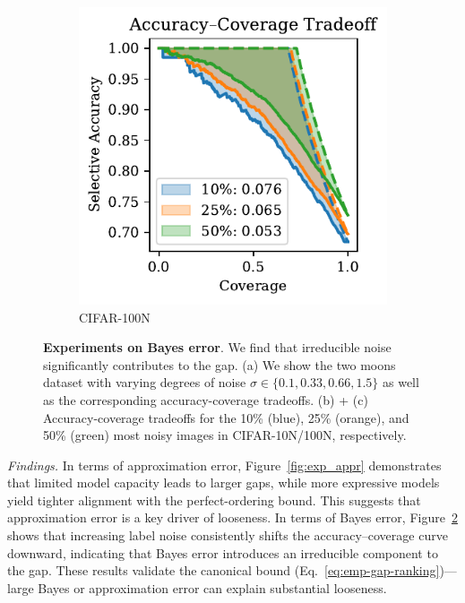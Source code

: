 \begin{figure}[t]
\begin{subfigure}[t]{0.24\textwidth}
    \includegraphics[width=\linewidth]{figs/sc_bounds/cifar100_noisy_tradeoff.pdf}
    \caption{CIFAR-100N}
    \label{fig:right}
  \end{subfigure}
  \caption[Experiments on Bayes error.]{\textbf{Experiments on Bayes error}. We find that irreducible noise significantly contributes to the gap. (a) We show the two moons dataset with varying degrees of noise $\sigma \in \{0.1,0.33,0.66,1.5\}$ as well as the corresponding accuracy-coverage tradeoffs. (b) + (c) Accuracy-coverage tradeoffs for the 10\% (blue), 25\% (orange), and 50\% (green) most noisy images in CIFAR-10N/100N, respectively.}
  \label{fig:exp_bayes}
\end{figure}

\emph{Findings.}
In terms of approximation error, Figure~\ref{fig:exp_appr} demonstrates that limited model capacity leads to larger gaps, while more expressive models yield tighter alignment with the perfect-ordering bound. This suggests that approximation error is a key driver of looseness. In terms of Bayes error, Figure~\ref{fig:exp_bayes} shows that increasing label noise consistently shifts the accuracy--coverage curve downward, indicating that Bayes error introduces an irreducible component to the gap. These results validate the canonical bound (Eq.~\ref{eq:emp-gap-ranking})---large Bayes or approximation error can explain substantial looseness.


